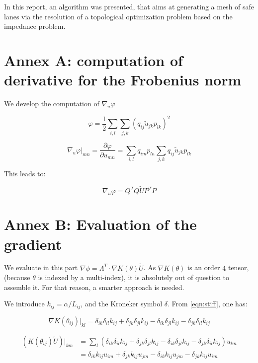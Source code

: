 \documentclass[11pt,a4paper]{article}		%
\begin{document}
In this report, an algorithm was presented, that aims at generating a mesh of safe lanes via the resolution of a topological optimization problem based on the impedance problem.

\section*{Annex A: computation of derivative for the Frobenius norm}

We develop the computation of $\nabla_u\varphi$

\begin{equation}
\varphi = \dfrac{1}{2} \sum_{i,l} \sum_{j,k} \left(q_{ij} \tilde{u}_{jk} p_{lk}\right)^2
\end{equation}

\begin{equation}
\nabla_u\varphi|_{mn} = \dfrac{\partial\varphi}{\partial u_{mn}} = \sum_{i,l} q_{im}p_{ln} \sum_{j,k} q_{ij} \tilde{u}_{jk} p_{lk}
\end{equation}

This leads to:

\begin{equation}
\nabla_u\varphi = Q^TQ\tilde{U}P^TP
\end{equation}

\section*{Annex B: Evaluation of the gradient}

We evaluate in this part $\nabla\phi = \Lambda^T \cdot \nabla K(\theta) \tilde{U}$. As $\nabla K(\theta)$ is an order $4$ tensor, (because $\theta$ is indexed by a multi-index), it is absolutely out of question to assemble it. For that reason, a smarter approach is needed.

We introduce $k_{ij} = \alpha/L_{ij}$, and the Kroneker symbol $\delta$. From \eqref{eqn:stiff}, one has:

\begin{equation}
\nabla K(\theta_{ij})|_{kl} = \delta_{ik} \delta_{il} k_{ij} + \delta_{jk} \delta_{jl} k_{ij} - \delta_{ik} \delta_{jl} k_{ij} - \delta_{jk} \delta_{il} k_{ij}
\end{equation}

\begin{equation}
\begin{aligned}
\left( K(\theta_{ij}) \tilde{U} \right)|_{km} &= \sum_l \left( \delta_{ik} \delta_{il} k_{ij} + \delta_{jk} \delta_{jl} k_{ij} - \delta_{ik} \delta_{jl} k_{ij} - \delta_{jk} \delta_{il} k_{ij} \right) u_{lm}\\
&= \delta_{ik} k_{ij} u_{im} + \delta_{jk} k_{ij} u_{jm} - \delta_{ik} k_{ij} u_{jm} - \delta_{jk} k_{ij} u_{im}
\end{aligned}
\end{equation}
\end{document}
